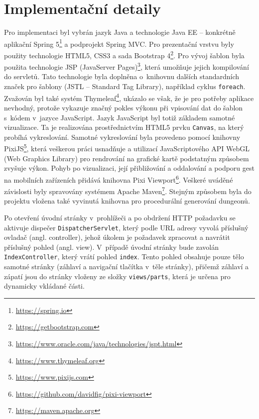 
\section{Implementační detaily}


Pro implementaci byl vybrán jazyk Java a technologie Java EE -- konkrétně aplikační Spring 5\footnote{\url{https://spring.io}} a podprojekt Spring MVC.
Pro prezentační vrstvu byly použity technologie HTML5, CSS3 a sada Bootstrap 4\footnote{\url{https://getbootstrap.com}}.
Pro vývoj šablon byla použita technologie JSP (JavaServer Pages)\footnote{\url{https://www.oracle.com/java/technologies/jspt.html}}, která umožňuje jejich kompilování do servletů.
Tato technologie byla doplněna o~knihovnu dalších standardních značek pro šablony (JSTL -- Standard Tag Library), například cyklus \texttt{foreach}.
Zvažován byl také systém Thymeleaf\footnote{\url{https://www.thymeleaf.org}}, ukázalo se však, že je pro potřeby aplikace nevhodný, protože vykazuje značný pokles výkonu při vpisování dat do šablon s~kódem v~jazyce JavaScript.
Jazyk JavaScript byl totiž základem samotné vizualizace.
Ta je realizována prostřednictvím HTML5 prvku \texttt{Canvas}, na který probíhá vykreslování.
Samotné vykreslování byla provedeno pomocí knihovny PixiJS\footnote{\url{https://www.pixijs.com}}, která veškerou práci usnadňuje a utilizací JavaScriptového API WebGL (Web Graphics Library) pro rendrování na grafické kartě podstatným způsobem zvyšuje výkon.
Pohyb po vizualizaci, její přibližování a oddalování a podporu gest na mobilních zařízeních přidává knihovna Pixi Viewport\footnote{\url{https://github.com/davidfig/pixi-viewport}}.
Veškeré uváděné závislosti byly spravovány systémem Apache Maven\footnote{\url{https://maven.apache.org}}.
Stejným způsobem byla do projektu vložena také vyvinutá knihovna pro procedurální generování dungeonů.
\par
Po otevření úvodní stránky v~prohlížeči a po obdržení HTTP požadavku se aktivuje dispečer \texttt{DispatcherServlet}, který podle URL adresy vyvolá příslušný ovladač (angl. controller), jehož úkolem je požadavek zpracovat a navrátit příslušný pohled (angl. view).
V~případě úvodní stránky bude zavolán \texttt{IndexController}, který vrátí pohled \texttt{index}.
Tento pohled obsahuje pouze tělo samotné stránky (záhlaví a navigační tlačítka v~těle stránky), přičemž záhlaví a zápatí jsou do stránky vloženy ze složky \texttt{views/parts}, která je určena pro dynamicky vkládané části.
